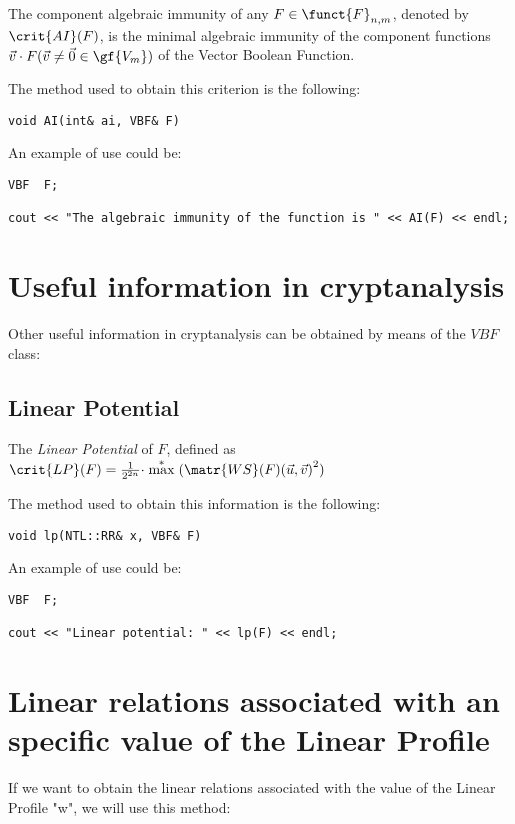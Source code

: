 The component algebraic immunity of any $F \in \funct{F}_{n,m}$, denoted by $\crit{AI}(F)$, is the minimal algebraic immunity of the component functions $\vec{v} \cdot
F (\vec{v} \neq \vec{0} \in \gf{V_m})$ of the Vector Boolean Function.

The method used to obtain this criterion is the following:

\begin{verbatim}
void AI(int& ai, VBF& F)
\end{verbatim}

An example of use could be:

\begin{verbatim}
VBF  F;

cout << "The algebraic immunity of the function is " << AI(F) << endl;
\end{verbatim}

\section{Useful information in cryptanalysis}

Other useful information in cryptanalysis can be obtained by means of the $VBF$ class:

\subsection{Linear Potential}

The \textsl{Linear Potential} of $F$, defined as $\crit{LP}(F) =
  \frac{1}{2^{2n}} \cdot
  \stackrel{*}{\max}({\matr{WS}(F)(\vec{u},\vec{v})}^2)$ 

The method used to obtain this information is the following:

\begin{verbatim}
void lp(NTL::RR& x, VBF& F)
\end{verbatim}

An example of use could be:

\begin{verbatim}
VBF  F;

cout << "Linear potential: " << lp(F) << endl;
\end{verbatim}

\section{Linear relations associated with an specific value of the Linear Profile}

If we want to obtain the linear relations associated with the value of the Linear Profile "w", we will use this method:

